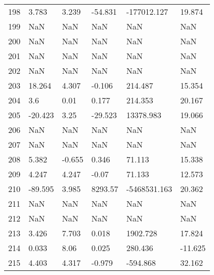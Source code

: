 \documentclass[11pt]{article}
\begin{document}
\begin{center}
\begin{longtable}{llllll}
        198 & 3.783      & 3.239                  & -54.831           & -177012.127        & 19.874   \\
        199 & NaN        & NaN                    & NaN               & NaN                & NaN      \\
        200 & NaN        & NaN                    & NaN               & NaN                & NaN      \\
        201 & NaN        & NaN                    & NaN               & NaN                & NaN      \\
        202 & NaN        & NaN                    & NaN               & NaN                & NaN      \\
        203 & 18.264     & 4.307                  & -0.106            & 214.487            & 15.354   \\
        204 & 3.6        & 0.01                   & 0.177             & 214.353            & 20.167   \\
        205 & -20.423    & 3.25                   & -29.523           & 13378.983          & 19.066   \\
        206 & NaN        & NaN                    & NaN               & NaN                & NaN      \\
        207 & NaN        & NaN                    & NaN               & NaN                & NaN      \\
        208 & 5.382      & -0.655                 & 0.346             & 71.113             & 15.338   \\
        209 & 4.247      & 4.247                  & -0.07             & 71.133             & 12.573   \\
        210 & -89.595    & 3.985                  & 8293.57           & -5468531.163       & 20.362   \\
        211 & NaN        & NaN                    & NaN               & NaN                & NaN      \\
        212 & NaN        & NaN                    & NaN               & NaN                & NaN      \\
        213 & 3.426      & 7.703                  & 0.018             & 1902.728           & 17.824   \\
        214 & 0.033      & 8.06                   & 0.025             & 280.436            & -11.625  \\
        215 & 4.403      & 4.317                  & -0.979            & -594.868           & 32.162   \\

\end{longtable}
\end{center}
\end{document}
